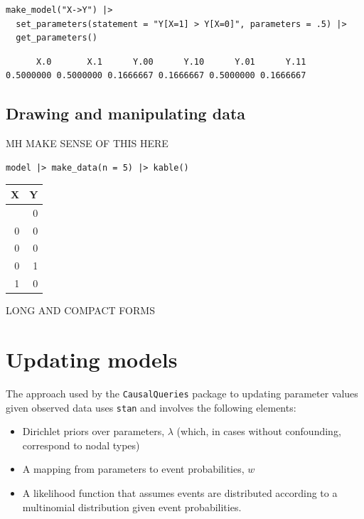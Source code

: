 \documentclass[
  article]{jss}
\providecommand{\tightlist}{%
  \setlength{\itemsep}{0pt}\setlength{\parskip}{0pt}}\usepackage{longtable,booktabs,array}
\begin{document}
\begin{verbatim}
make_model("X->Y") |>
  set_parameters(statement = "Y[X=1] > Y[X=0]", parameters = .5) |>
  get_parameters()
\end{verbatim}

\begin{verbatim}
      X.0       X.1      Y.00      Y.10      Y.01      Y.11 
0.5000000 0.5000000 0.1666667 0.1666667 0.5000000 0.1666667 
\end{verbatim}

\hypertarget{drawing-and-manipulating-data}{%
\subsection{Drawing and manipulating
data}\label{drawing-and-manipulating-data}}

MH MAKE SENSE OF THIS HERE

\begin{verbatim}
model |> make_data(n = 5) |> kable()
\end{verbatim}

\begin{longtable}[]{@{}rr@{}}
\toprule\noalign{}
X & Y \\
\midrule\noalign{}
\endhead
\bottomrule\noalign{}
\endlastfoot
0 & 0 \\
0 & 0 \\
0 & 0 \\
0 & 1 \\
1 & 0 \\
\end{longtable}

LONG AND COMPACT FORMS

\hypertarget{updating-models}{%
\section{Updating models}\label{updating-models}}

The approach used by the \texttt{CausalQueries} package to updating
parameter values given observed data uses \texttt{stan} and involves the
following elements:

\begin{itemize}
\tightlist
\item
  Dirichlet priors over parameters, \(\lambda\) (which, in cases without
  confounding, correspond to nodal types)
\item
  A mapping from parameters to event probabilities, \(w\)
\item
  A likelihood function that assumes events are distributed according to
  a multinomial distribution given event probabilities.
\end{itemize}
\end{document}
